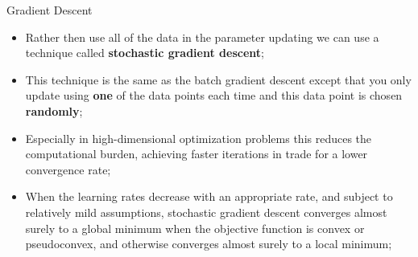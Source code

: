 \documentclass[11pt]{beamer}
\begin{document}
\begin{frame}{Gradient Descent}
\begin{itemize}
\item Rather then use all of the data in the parameter updating we can use a technique called \textbf{stochastic gradient descent};
\item This technique is the same as the batch gradient descent except that you only update using \textbf{one} of the data points each time and this data point is chosen \textbf{randomly};
\item Especially in high-dimensional optimization problems this reduces the computational burden, achieving faster iterations in trade for a lower convergence rate;
\item When the learning rates decrease with an appropriate rate, and subject to relatively mild assumptions, stochastic gradient descent converges almost surely to a global minimum when the objective function is convex or pseudoconvex, and otherwise converges almost surely to a local minimum;
\end{itemize}
\end{frame}

\end{document}
